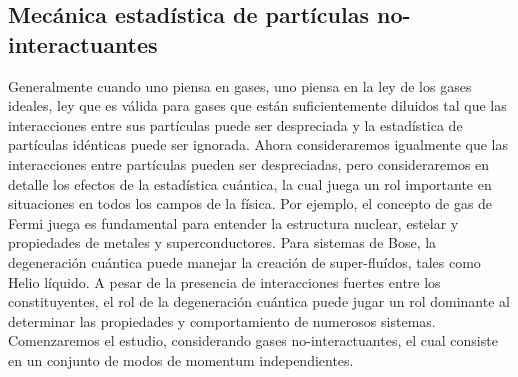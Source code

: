 \subsection{Mecánica estadística de partículas no-interactuantes}
Generalmente cuando uno piensa en gases, uno piensa en la ley de los gases ideales, ley que es válida para gases que están suficientemente diluidos tal que las interacciones entre sus partículas puede ser despreciada y la estadística de partículas idénticas puede ser ignorada. Ahora consideraremos igualmente que las interacciones entre partículas pueden ser despreciadas, pero consideraremos en detalle los efectos de la estadística cuántica, la cual juega un rol importante en situaciones en todos los campos de la física. Por ejemplo, el concepto de gas de Fermi juega es fundamental para entender la estructura nuclear, estelar y propiedades de metales y superconductores. Para sistemas de Bose, la degeneración cuántica puede manejar la creación de super-fluídos, tales como Helio líquido. A pesar de la presencia de interacciones fuertes entre los constituyentes, el rol de la degeneración cuántica puede jugar un rol dominante al determinar las propiedades y comportamiento de numerosos sistemas. Comenzaremos el estudio, considerando gases no-interactuantes, el cual consiste en un conjunto de modos de momentum independientes.

